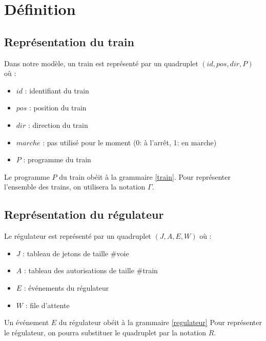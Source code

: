\documentclass[12pt]{article}
\begin{document}
\newcommand\ruleCrash[2]{ %
    \inferrule
        {#1 \neq #2}
        {\Gamma, \train{#1}{pos}{dir}{P}, \train{#2}{pos}{dir'}{P'}  \Rightarrow \bot}
}

\newcommand\ruleCrashSec[3]{ %
    \inferrule
        {\lnot suiv(#2, #3) = \emptyset \\ #3 \neq * \\ R.A[#1] \neq #2}
        {\trainfull{#1}{#2}{#3}{P}, R \Rightarrow \bot}
}


\maketitle


\section{Définition}

\subsection{Représentation du train}
Dans notre modèle, un train est représenté par un quadruplet $(id, pos, dir, P)$ où :
\begin{itemize}
    \item $id$ : identifiant du train
    \item $pos$ : position du train 
    \item $dir$ : direction du train
    \item $marche$ : pas utilisé pour le moment (0: à l'arrêt, 1: en marche)
    \item $P$ : programme du train
\end{itemize}
Le programme $P$ du train obéit à la grammaire \ref{train}.
Pour représenter l'ensemble des trains, on utilisera la notation $\Gamma$.

\subsection{Représentation du régulateur}
Le régulateur est représenté par un quadruplet $(J, A, E, W)$ où :
\begin{itemize}
    \item $J$ : tableau de jetons de taille $\#$voie
    \item $A$ : tableau des autorisations de taille $\#$train
    \item $E$ : événements du régulateur
    \item $W$ : file d'attente
\end{itemize}
Un événement $E$ du régulateur obéit à la grammaire \ref{regulateur}
Pour représenter le régulateur, on pourra substituer le quadruplet par la notation $R$.
\end{document}
